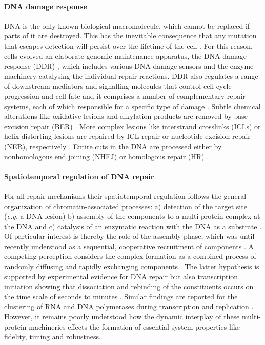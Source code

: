 \paragraph{DNA damage response}    
DNA is the only known biological macromolecule, which cannot be replaced if parts of it are destroyed. This has the inevitable consequence that any mutation that escapes detection will persist over the lifetime of the cell \cite{Hoeijmakers2009,Marteijn2014}. For this reason, cells evolved an elaborate genomic maintenance apparatus, the DNA damage response (DDR) \cite{Ciccia2010}, which includes various DNA-damage sensors and the enzyme machinery catalysing the individual repair reactions. DDR also regulates a range of downstream mediators and signalling molecules that control cell cycle progression and cell fate and it comprises a number of complementary repair systems, each of which responsible for a specific type of damage \cite{Ciccia2010,Marteijn2014}. Subtle chemical alterations like oxidative lesions and alkylation products are removed by base-excision repair (BER) \cite{Lindahl2000,Caldecott2008}. More complex lesions like interstrand crosslinks (ICLs) or helix distorting lesions are repaired by ICL repair or nucleotide excision repair (NER), respectively \cite{Moldovan2009,Hoeijmakers2009}. Entire cuts in the DNA are processed either by nonhomologous end joining (NHEJ) or homologous repair (HR) \cite{Caldecott2008,West2003}. 

\paragraph{Spatiotemporal regulation of DNA repair} For all repair mechanisms their spatiotemporal regulation follows the general organization of chromatin-associated processes: a) detection of the target site (\textit{e.g.} a DNA lesion) b) assembly of the components to a multi-protein complex at the DNA and c) catalysis of an enzymatic reaction with the DNA as a substrate \cite{Hoeijmakers:2001:Nature:11357144,Gillet:2006:Chem-Rev:16464005,Dinant:2009:J-Cell-Biol:19332890,Luijsterburg2010}. Of particular interest is thereby the role of the assembly phase, which was until recently understood as a sequential, cooperative recruitment of components \cite{Volker2001}. A competing perception considers the complex formation as a combined process of randomly diffusing and rapidly exchanging components \cite{Luijsterburg2010}. The latter hypothesis is supported by experimental evidence for DNA repair but also transcription initiation showing that dissociation and rebinding of the constituents occurs on the time scale of seconds to minutes \cite{Vermeulen2011,Stasevich2011}. Similar findings are reported for the clustering of RNA and DNA polymerases during transcription and replication \cite{Kuipers2011,Sonneville2012}. However, it remains poorly understood how the dynamic interplay of these multi-protein machineries effects the formation of essential system properties like fidelity, timing and robustness. 




